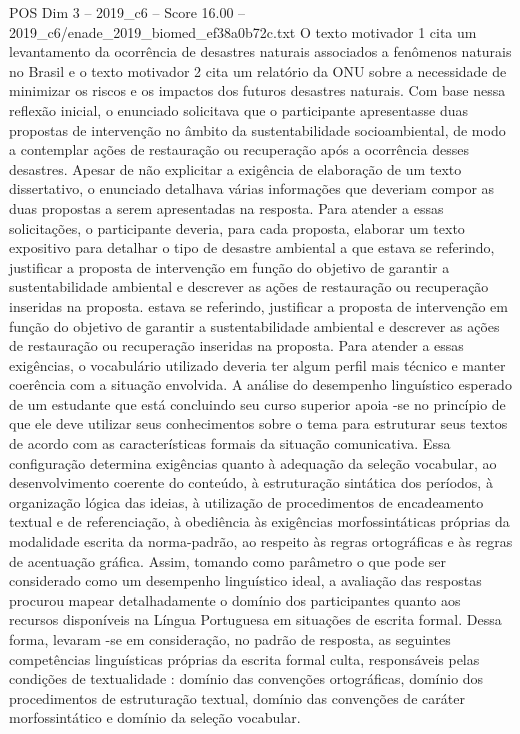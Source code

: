 \begin{textsample}{POS Dim 3 – 2019\_c6 – Score 16.00 – 2019\_c6/enade\_2019\_biomed\_ef38a0b72c.txt}
O texto motivador 1 cita um levantamento da ocorrência de desastres naturais associados a fenômenos naturais no Brasil e o texto motivador 2 cita um relatório da ONU sobre a necessidade de minimizar os riscos e os impactos dos futuros desastres naturais.
Com base nessa reflexão inicial, o enunciado solicitava que o participante apresentasse duas propostas de intervenção no âmbito da sustentabilidade socioambiental, de modo a contemplar ações de restauração ou recuperação após a ocorrência desses desastres.
Apesar de não explicitar a exigência de elaboração de um texto dissertativo, o enunciado detalhava várias informações que deveriam compor as duas propostas a serem apresentadas na resposta.
Para atender a essas solicitações, o participante deveria, para cada proposta, elaborar um texto expositivo para detalhar o tipo de desastre ambiental a que estava se referindo, justificar a proposta de intervenção em função do objetivo de garantir a sustentabilidade ambiental e descrever as ações de restauração ou recuperação inseridas na proposta. estava se referindo, justificar a proposta de intervenção em função do objetivo de garantir a sustentabilidade ambiental e descrever as ações de restauração ou recuperação inseridas na proposta.
Para atender a essas exigências, o vocabulário utilizado deveria ter algum perfil mais técnico e manter coerência com a situação envolvida.
A análise do desempenho linguístico esperado de um estudante que está concluindo seu curso superior apoia -se no princípio de que ele deve utilizar seus conhecimentos sobre o tema para estruturar seus textos de acordo com as características formais da situação comunicativa.
Essa configuração determina exigências quanto à adequação da seleção vocabular, ao desenvolvimento coerente do conteúdo, à estruturação sintática dos períodos, à organização lógica das ideias, à utilização de procedimentos de encadeamento textual e de referenciação, à obediência às exigências morfossintáticas próprias da modalidade escrita da norma-padrão, ao respeito às regras ortográficas e às regras de acentuação gráfica.
Assim, tomando como parâmetro o que pode ser considerado como um desempenho linguístico ideal, a avaliação das respostas procurou mapear detalhadamente o domínio dos participantes quanto aos recursos disponíveis na Língua Portuguesa em situações de escrita formal.
Dessa forma, levaram -se em consideração, no padrão de resposta, as seguintes competências linguísticas próprias da escrita formal culta, responsáveis pelas condições de textualidade : domínio das convenções ortográficas, domínio dos procedimentos de estruturação textual, domínio das convenções de caráter morfossintático e domínio da seleção vocabular.

\end{textsample}
